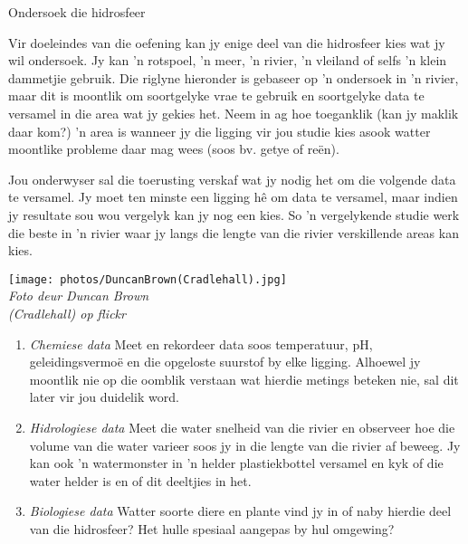             \begin{Investigation}{Ondersoek die hidrosfeer }
            \nopagebreak 
\begin{minipage}{.5\textwidth}
            \label{m38138*uid4}
Vir doeleindes van die oefening kan jy enige deel van die hidrosfeer kies wat jy wil ondersoek. Jy kan  'n rotspoel,  'n meer,  'n rivier,  'n vleiland of selfs  'n klein dammetjie gebruik. Die riglyne hieronder is gebaseer op  'n ondersoek in  'n rivier, maar dit is moontlik om soortgelyke vrae te gebruik en soortgelyke data te versamel in die area wat jy gekies het. Neem in ag hoe toeganklik (kan jy maklik daar kom?)  'n area is wanneer jy die ligging vir jou studie kies asook watter moontlike probleme daar mag wees (soos bv. getye of re\"{e}n).\par
\label{m38138*uid5}
Jou onderwyser sal die toerusting verskaf wat jy nodig het om die volgende data te versamel. Jy moet ten minste een ligging h\^{e} om data te versamel, maar indien jy resultate sou wou vergelyk kan jy nog een kies. So  'n vergelykende studie werk die beste in  'n rivier waar jy langs die lengte van die rivier verskillende areas kan kies. \par
\end{minipage}
\begin{minipage}{.5\textwidth}
\begin{center}
 \texttt{[image: photos/DuncanBrown(Cradlehall).jpg]} \\
\textsl{Foto deur Duncan Brown\\ (Cradlehall) op flickr}
\end{center}
\end{minipage}
\label{m38138*id334646}\begin{enumerate}[noitemsep, label=\textbf{\arabic*}. ] 
            \label{m38138*uid6}\item \textsl{Chemiese data}
Meet en rekordeer data soos temperatuur, pH, geleidingsvermoë en die opgeloste suurstof by elke ligging. Alhoewel jy moontlik nie op die oomblik verstaan wat hierdie metings beteken nie, sal dit later vir jou duidelik word.
\label{m38138*uid7}\item \textsl{Hidrologiese data}
Meet die water snelheid van die rivier en observeer hoe die volume van die water varieer soos jy in die lengte van die rivier af beweeg. Jy kan ook  'n watermonster in  'n helder plastiekbottel versamel en kyk of die water helder is en of dit deeltjies in het.
\label{m38138*uid8}\item \textsl{Biologiese data}
Watter soorte diere en plante vind jy in of naby hierdie deel van die hidrosfeer? Het hulle spesiaal aangepas by hul omgewing?
\end{enumerate}


\end{Investigation}
